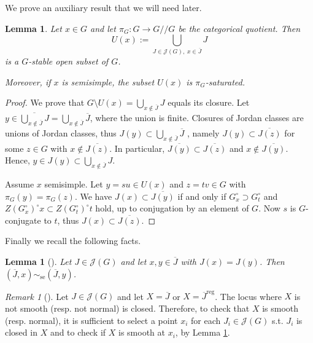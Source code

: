 \documentclass[12pt]{amsart}
\newtheorem{Lemma}[Theorem]{Lemma}
\theoremstyle{definition}
\theoremstyle{remark}
\newtheorem{Remark}[Theorem]{Remark}
\newcommand{\reg}{{\operatorname{reg}}}
\newcommand{\se}{\operatorname{se}}
\begin{document}
We prove an auxiliary result that we will need later.

\begin{Lemma} \label{lem_jnghd}
Let $x \in G$ and let $\pi_G \colon G \to G/\!/G$ be the categorical quotient.
Then $$U(x):= \bigcup_{J \in \mathcal{J}(G), \; x \in \overline{J}} J$$ is a $G$-stable open subset of $G$.

Moreover, if $x$ is semisimple, the subset $U(x)$ is $\pi_G$-saturated.
\end{Lemma}

\begin{proof}
We prove that $ G \setminus U(x) = \bigcup_{x \notin \overline{J}} J$ equals its closure.
Let $ y \in  \overline{\bigcup_{x \notin \overline{J}} J} = \bigcup_{x \notin \overline{J}} \overline{J}$, where the union is finite.
Closures of Jordan classes are unions of Jordan classes, thus $J(y) \subset \bigcup_{x \notin \overline{J}} \overline{J}$ , namely $J(y) \subset \overline{J(z)}$ for some $z \in G$ with $x \notin \overline{J(z)}$.
In particular, $\overline{J(y)} \subset  \overline{J(z)}$ and $x \notin \overline{J(y)}$.
Hence, $y \in J(y) \subset \bigcup_{x \notin \overline{J}} J$.

Assume $x$  semisimple. 
Let $y=su \in U(x)$ and $z = tv \in G$ with $\pi_G(y) = \pi_G(z)$.
We have $J(x) \subset \overline{J(y)}$ if and only if $G_x^\circ \supset G_t^\circ$ and $Z(G_x^\circ)^\circ x \subset Z(G_t^\circ)^\circ t$ hold, up to conjugation by an element of $G$.
Now $s$ is $G$-conjugate to $t$, thus $J(x) \subset \overline{J(z)}$.
\end{proof}

Finally we recall the following facts.
\begin{Lemma}[{{\cite[Corollary 4.5]{ACE}}}] \label{lem_geom}
Let $J \in \mathcal{J}(G)$ and let $x,y \in \overline{J}$ with $J(x) = J(y)$.
Then $(\overline{J}, x) \sim_{\se} (\overline{J}, y)$.
\end{Lemma}

\begin{Remark}[{{\cite[Remark 6.4]{ACE}}}] \label{rmk_geom}
Let $J \in \mathcal{J}(G)$ and let $X = \overline{J}$ or $X = \overline{J}^\reg$.
The locus where $X$ is not smooth (resp. not normal) is closed.
Therefore, to check that $X$ is smooth (resp. normal), it is sufficient to select a point $x_i$ for each  $J_i \in \mathcal{J}(G)$ s.t. $J_i$ is closed in $X$ and to check if $X$ is smooth at $x_i$, by Lemma \ref{lem_geom}.
\end{Remark}
\end{document}

